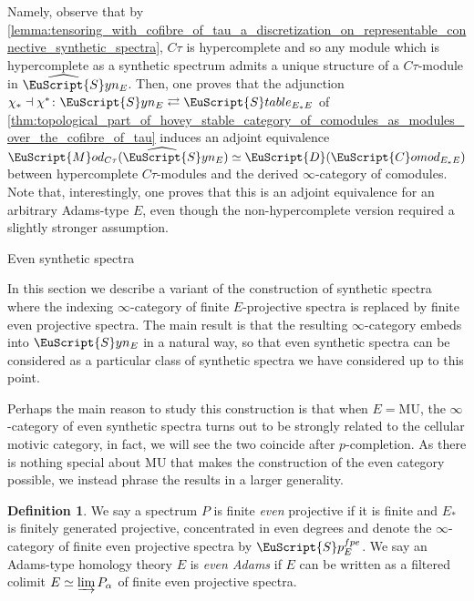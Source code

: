 \documentclass[oneside,a4paper]{amsart}
\makeatletter
\newcommand{\euscr}[1]{\EuScript{#1}} %
\newcommand{\dcat}{\euscr{D}} %
\newcommand{\MU}{\mathrm{MU}} %
\newcommand{\spectra}{\euscr{S}p} %
\newcommand{\stableE}{\euscr{S}table_{E_{*}E}} %
\newcommand{\synspectra}{\euscr{S}yn} %
\newcommand{\hpsynspectra}{\widehat{\euscr{S}}yn} %
\newcommand{\Comod}{\euscr{C}omod} %
\newcommand{\ComodE}{\Comod_{E_{*}E}} %
\newcommand{\Mod}{\euscr{M}od} %
\theoremstyle{plain}
\theoremstyle{definition}
\newtheorem{defin}[thm]{Definition}
\theoremstyle{remark}
\def\subsection{\@startsection{subsection}{1}%
  \z@{.7\linespacing\@plus\linespacing}{.5\linespacing}%
  {\normalfont\bfseries\centering}}%
\makeatother
\begin{document}
Namely, observe that by \cref{lemma:tensoring_with_cofibre_of_tau_a_discretization_on_representable_connective_synthetic_spectra}, $C\tau$ is hypercomplete and so any module which is hypercomplete as a synthetic spectrum admits a unique structure of a $C\tau$-module in $\hpsynspectra_{E}$. Then, one proves that the adjunction $\chi_{*} \dashv \chi^{*} \colon \synspectra_{E} \rightleftarrows \stableE$ of \cref{thm:topological_part_of_hovey_stable_category_of_comodules_as_modules_over_the_cofibre_of_tau} induces an adjoint equivalence $\Mod_{C\tau}(\hpsynspectra_{E}) \simeq \dcat(\ComodE)$ between hypercomplete $C\tau$-modules and the derived $\infty$-category of comodules. Note that, interestingly, one proves that this is an adjoint equivalence for an arbitrary Adams-type $E$, even though the non-hypercomplete version required a slightly stronger assumption.

\subsection{Even synthetic spectra}
\label{subsection:even_synthetic_spectra}

In this section we describe a variant of the construction of synthetic spectra where the indexing $\infty$-category of finite $E$-projective spectra is replaced by finite even projective spectra. The main result is that the resulting $\infty$-category embeds into $\synspectra_{E}$ in a natural way, so that even synthetic spectra can be considered as a particular class of synthetic spectra we have considered up to this point. 

Perhaps the main reason to study this construction is that when $E = \MU$, the $\infty$-category of even synthetic spectra turns out to be strongly related to the cellular motivic category, in fact, we will see the two coincide after $p$-completion. As there is nothing special about $\MU$ that makes the construction of the even category possible, we instead phrase the results in a larger generality. 

\begin{defin}
\label{defin:finite_even_projective_spectrum}
We say a spectrum $P$ is finite \emph{even} projective if it is finite and $E_{*}$ is finitely generated projective, concentrated in even degrees and denote the $\infty$-category of finite even projective spectra by $\spectra_{E}^{fpe}$. We say an Adams-type homology theory $E$ is \emph{even Adams} if $E$ can be written as a filtered colimit $E \simeq \varinjlim P_{\alpha}$ of finite even projective spectra.
\end{defin}
\end{document}
